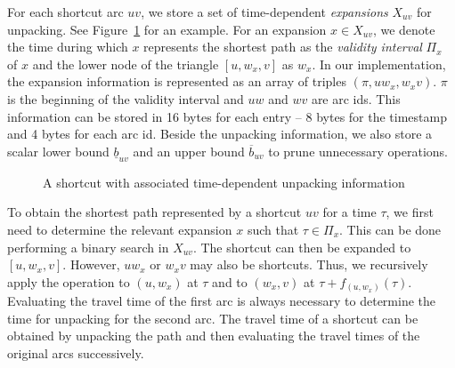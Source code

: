 \documentclass[a4paper,UKenglish,cleveref,autoref]{lipics-v2019}
\begin{document}
For each shortcut arc $uv$, we store a set of time-dependent \emph{expansions} $X_{uv}$ for unpacking.
See Figure~\ref{fig:shortcut_data} for an example.
For an expansion $x \in X_{uv}$, we denote the time during which $x$ represents the shortest path as the \emph{validity interval} $\Pi_x$ of $x$ and the lower node of the triangle $[u, w_x, v]$ as $w_x$.
In our implementation, the expansion information is represented as an array of triples $(\pi, u w_x, w_x v)$.
$\pi$ is the beginning of the validity interval and $uw$ and $wv$ are arc ids.
This information can be stored in 16 bytes for each entry -- 8 bytes for the timestamp and 4 bytes for each arc id.
Beside the unpacking information, we also store a scalar lower bound $\underline{b}_{uv}$ and an upper bound $\overline{b}_{uv}$ to prune unnecessary operations.

\begin{figure}
\centering
{}
\caption{A shortcut with associated time-dependent unpacking information}\label{fig:shortcut_data}
\end{figure}

To obtain the shortest path represented by a shortcut $uv$ for a time $\tau$, we first need to determine the relevant expansion $x$ such that $\tau \in \Pi_x$.
This can be done performing a binary search in $X_{uv}$.
The shortcut can then be expanded to $[u,w_x,v]$.
However, $u w_x$ or $w_x v$ may also be shortcuts.
Thus, we recursively apply the operation to $(u, w_x)$ at $\tau$ and to $(w_x, v)$ at $\tau + f_{(u, w_x)}(\tau)$.
Evaluating the travel time of the first arc is always necessary to determine the time for unpacking for the second arc.
The travel time of a shortcut can be obtained by unpacking the path and then evaluating the travel times of the original arcs successively.
\end{document}
